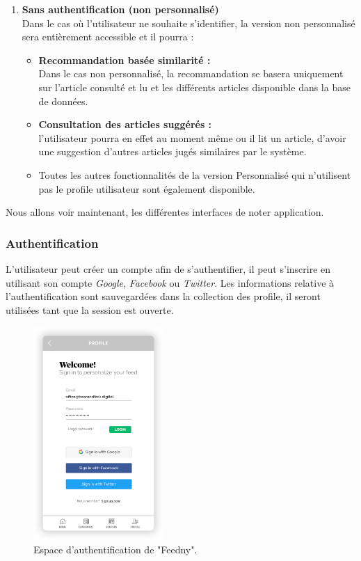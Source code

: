 \begin{enumerate}[leftmargin=*]
        \item\textbf{Sans authentification (non personnalisé)}\\
        Dans le cas où l'utilisateur ne souhaite s'identifier, la version non personnalisé sera entièrement accessible et il pourra :
        \begin{itemize}
            \item \textbf{Recommandation basée similarité :}\\
            Dans le cas non personnalisé, la recommandation se basera uniquement sur l'article consulté et lu et les différents articles disponible dans la base de données.    
            \item \textbf{Consultation des articles suggérés :}\\
            l'utilisateur pourra en effet au moment même ou il lit un article, d'avoir une suggestion d'autres articles jugés similaires par le système.
            \item Toutes les autres fonctionnalités de la version Personnalisé qui n'utilisent pas le profile utilisateur sont également disponible.
        \end{itemize}
    \end{enumerate}
    \vspace*{0.7cm}
    Nous allons voir maintenant, les différentes interfaces de noter application.
    \subsubsection{Authentification}
    L'utilisateur peut créer un compte afin de s'authentifier, il peut s'inscrire en utilisant son compte \emph{Google}, \emph{Facebook} ou \emph{Twitter}.
    Les informations relative à l'authentification sont sauvegardées dans la collection des profile, il seront utilisées tant que la session est ouverte.  
        \begin{figure}[H]
            \centering
            \includegraphics[width=140pt]{img/chapter4/feedny/en-sigin.png}
            \caption{Espace d'authentification de "Feedny".}
            \label{}
        \end{figure}


